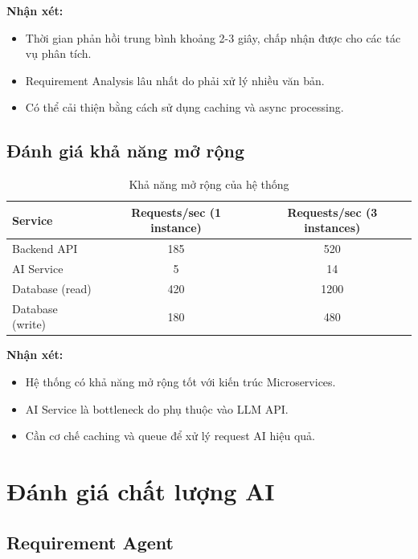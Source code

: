 \documentclass[12pt,a4paper]{report}
\begin{document}
\textbf{Nhận xét:}
\begin{itemize}
\item Thời gian phản hồi trung bình khoảng 2-3 giây, chấp nhận được cho các tác vụ phân tích.
\item Requirement Analysis lâu nhất do phải xử lý nhiều văn bản.
\item Có thể cải thiện bằng cách sử dụng caching và async processing.
\end{itemize}

\subsection{Đánh giá khả năng mở rộng}

\begin{table}[H]
\centering
\caption{Khả năng mở rộng của hệ thống}
\begin{tabular}{|p{5cm}|c|c|}
\hline
\textbf{Service} & \textbf{Requests/sec (1 instance)} & \textbf{Requests/sec (3 instances)} \\
\hline
Backend API & 185 & 520 \\
\hline
AI Service & 5 & 14 \\
\hline
Database (read) & 420 & 1200 \\
\hline
Database (write) & 180 & 480 \\
\hline
\end{tabular}
\label{tab:scalability}
\end{table}

\textbf{Nhận xét:}
\begin{itemize}
\item Hệ thống có khả năng mở rộng tốt với kiến trúc Microservices.
\item AI Service là bottleneck do phụ thuộc vào LLM API.
\item Cần cơ chế caching và queue để xử lý request AI hiệu quả.
\end{itemize}

\section{Đánh giá chất lượng AI}

\subsection{Requirement Agent}
\end{document}
